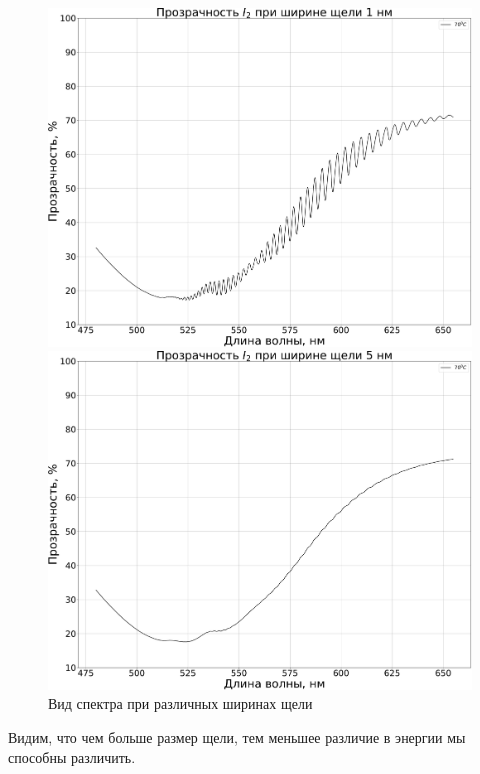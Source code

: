 \begin{figure}[H]
\begin{minipage}[h!]{0.5\linewidth}
	\end{minipage}
	\begin{minipage}[h!]{0.5\linewidth}
		\centering
		\includegraphics[width=1\linewidth]{data/absorption_spectrum_slit_1}
	\end{minipage}
	\begin{minipage}[h!]{0.5\linewidth}
		\centering
		\includegraphics[width=1\linewidth]{data/absorption_spectrum_slit_5}
	\end{minipage}
	\caption{Вид спектра при различных ширинах щели}
	\label{fig:absorption_spectrum_slit}
\end{figure}
Видим, что чем больше размер щели, тем меньшее различие в энергии мы способны различить.




